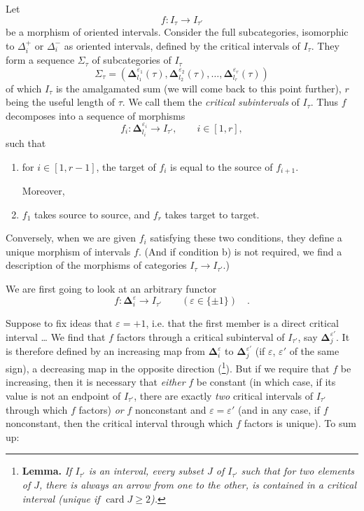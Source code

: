 \documentclass[11pt]{article}
\newcommand{\printedpage}[1]{\marginpar{\footnotesize p.~#1}}
\newcommand{\msp}[1]{\marginpar{\footnotesize [#1]}}
\newcommand{\bDelta}{\boldsymbol{\Delta}}
\begin{document}
\msp{page 32}
Let
\[
f : I_\tau\longrightarrow I_{\tau'}
\]
be a morphism of oriented intervals. Consider the full subcategories, isomorphic to $\Delta_i^+$ or $\Delta_i^-$ as oriented intervals, defined by the critical intervals of $I_\tau$. They form a sequence $\Sigma_\tau$ of subcategories of $I_\tau$
\[
\Sigma_\tau=(\bDelta^{\varepsilon_1}_{l_1}(\tau),\bDelta^{\varepsilon_2}_{l_2}(\tau),\ldots,\bDelta^{\varepsilon_r}_{l_r}(\tau))
\]
of which $I_\tau$ is the amalgamated sum (we will come back to this point further), $r$ being the useful length of $\tau$. We call them the \textit{critical subintervals} of $I_\tau$. Thus $f$ decomposes into a sequence of morphisms
\[
f_i : \bDelta^{\varepsilon_i}_{l_i}\longrightarrow I_{\tau'},\qquad i\in[1,r],
\]
such that
\begin{enumerate}
\item[a)] for $i\in[1,r-1]$, the target of $f_i$ is equal to the source of $f_{i+1}$.

Moreover,
\item[b)] $f_1$ takes source to source, and $f_r$ takes target to target.
\end{enumerate}

Conversely, when we are given $f_i$ satisfying these two conditions, they define a unique morphism of intervals $f$. (And if condition b) is not required, we find a description of the morphisms of categories $I_\tau\longrightarrow I_{\tau'}$.)

\msp{page 33}
We are first going to look at an arbitrary functor
\[
f : \bDelta^{\varepsilon}_i\longrightarrow I_{\tau'}\qquad(\varepsilon\in\{\pm1\})\quad .
\]

\printedpage{22}
Suppose to fix ideas that $\varepsilon=+1$, i.e. that the first member is a direct critical interval \ldots{} We find that $f$ factors through a critical subinterval of $I_{\tau'}$, say $\bDelta^{\varepsilon'}_j$. It is therefore defined by an increasing map from $\bDelta^{\varepsilon}_i$ to $\bDelta^{\varepsilon'}_j$ (if $\varepsilon$, $\varepsilon'$ of the same sign), a decreasing map in the opposite direction (\footnote[11]{\textbf{Lemma.} \textit{If $I_{\tau'}$ is an interval, every subset $J$ of $I_{\tau'}$ such that for two elements of $J$, there is always an arrow from one to the other, is contained in a critical interval (unique if} $\operatorname{card} J\geq 2$\textit{).}}). But if we require that $f$ be increasing, then it is necessary that \textit{either} $f$ be constant (in which case, if its value is not an endpoint of $I_{\tau'}$, there are exactly \textit{two} critical intervals of $I_{\tau'}$ through which $f$ factors) \textit{or} $f$ nonconstant and $\varepsilon=\varepsilon'$ (and in any case, if $f$ nonconstant, then the critical interval through which $f$ factors is unique). To sum up:
\end{document}
